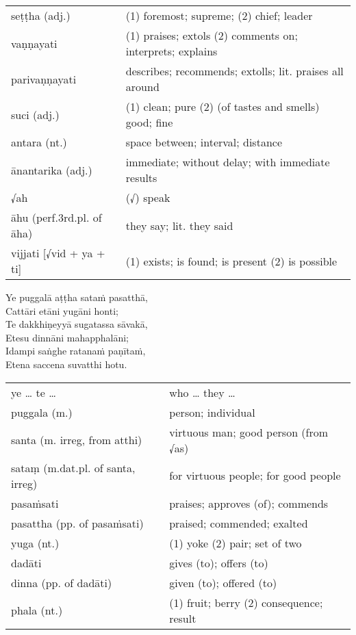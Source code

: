 \documentclass[11pt,oneside]{memoir}
\begin{document}
\begin{longtable}{L{\colOne} L{\colTwo}}
seṭṭha (adj.) & (1) foremost; supreme; (2) chief; leader\\[0pt]
vaṇṇayati & (1) praises; extols (2) comments on; interprets; explains\\[0pt]
parivaṇṇayati & describes; recommends; extolls; lit. praises all around\\[0pt]
suci (adj.) & (1) clean; pure (2) (of tastes and smells) good; fine\\[0pt]
antara (nt.) & space between; interval; distance\\[0pt]
ānantarika (adj.) & immediate; without delay; with immediate results\\[0pt]
√ah & (√) speak\\[0pt]
āhu (perf.3rd.pl. of āha) & they say; lit. they said\\[0pt]
vijjati [√vid + ya + ti] & (1) exists; is found; is present (2) is possible\\[0pt]
\end{longtable}

\begin{spacedquote}
Ye puggalā aṭṭha sataṁ pasatthā, \\[0pt]
Cattāri etāni yugāni honti; \\[0pt]
Te dakkhiṇeyyā sugatassa sāvakā, \\[0pt]
Etesu dinnāni mahapphalāni; \\[0pt]
Idampi saṅghe ratanaṁ paṇītaṁ, \\[0pt]
Etena saccena suvatthi hotu.
\end{spacedquote}

\begin{longtable}{L{\colOne} L{\colTwo}}
ye \ldots{} te \ldots{} & who \ldots{} they \ldots{}\\[0pt]
puggala (m.) & person; individual\\[0pt]
santa (m. irreg, from atthi) & virtuous man; good person (from √as)\\[0pt]
sataṃ (m.dat.pl. of santa, irreg) & for virtuous people; for good people\\[0pt]
pasaṁsati & praises; approves (of); commends\\[0pt]
pasattha (pp. of pasaṁsati) & praised; commended; exalted\\[0pt]
yuga (nt.) & (1) yoke (2) pair; set of two\\[0pt]
dadāti & gives (to); offers (to)\\[0pt]
dinna (pp. of dadāti) & given (to); offered (to)\\[0pt]
phala (nt.) & (1) fruit; berry (2) consequence; result\\[0pt]
\end{longtable}
\end{document}
